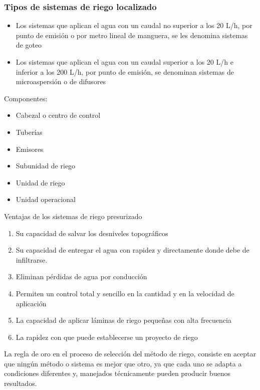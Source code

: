 \subsubsection{Tipos de sistemas de riego localizado}
\begin{itemize}
    \item Los sistemas que aplican el agua con un caudal no superior a los 20 L/h, por punto de emisión o por metro lineal de manguera, se les denomina sistemas de goteo
    \item Los sistemas que aplican el agua con un caudal superior a los 20 L/h e inferior a los 200 L/h, por punto de emisión, se denominan sistemas de microaspersión o de difusores
\end{itemize}
Componentes:
\begin{itemize}
    \item Cabezal o centro de control
    \item Tuberías
    \item Emisores
    \item Subunidad de riego
    \item Unidad de riego
    \item Unidad operacional
\end{itemize}
Ventajas de los sistemas de riego presurizado
\begin{enumerate}
    \item Su capacidad de salvar los desniveles topográficos
    \item Su capacidad de entregar el agua con rapidez y directamente donde debe de infiltrarse.
    \item Eliminan pérdidas de agua por conducción
    \item Permiten un control total y sencillo en la cantidad y en la velocidad de aplicación
    \item La capacidad de aplicar láminas de riego pequeñas con alta frecuencia
    \item La rapidez con que puede establecerse un proyecto de riego
\end{enumerate}
La regla de oro en el proceso de selección del método de riego, consiste en aceptar que ningún método o sistema es mejor que otro, ya que cada uno se adapta a condiciones diferentes y, manejados técnicamente pueden producir buenos resultados.
